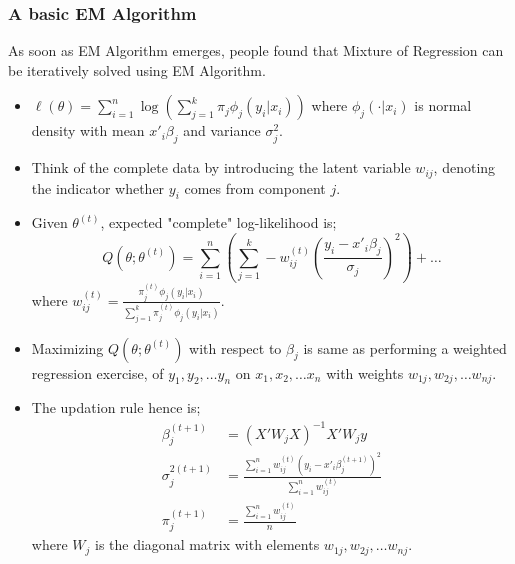 \documentclass{beamer}
\begin{document}
\begin{frame}
	\frametitle{A basic EM Algorithm}
	As soon as EM Algorithm emerges, people found that Mixture of Regression can be iteratively solved using EM Algorithm.
	\begin{itemize}
		\item ${\ell}(\theta) = \sum_{i=1}^{n} \log \left( \sum_{j=1}^{k} \pi_j\phi_j(y_i\vert x_i) \right)$ where $\phi_j(\cdot\vert x_i)$ is normal density with mean $x'_i\beta_j$ and variance $\sigma_j^2$.
		\item Think of the complete data by introducing the latent variable $w_{ij}$, denoting the indicator whether $y_i$ comes from component $j$.
		\item Given $\theta^{(t)}$, expected "complete" log-likelihood is;
		$$Q(\theta; \theta^{(t)}) = \sum_{i=1}^{n} \left( \sum_{j=1}^{k} - w_{ij}^{(t)} \left(\frac{y_i - x'_i\beta_j}{\sigma_j}\right)^2 \right) + \dots $$
		where $w_{ij}^{(t)} = \frac{\pi_j^{(t)}\phi_j(y_i\vert x_i)}{\sum_{j=1}^{k} \pi_j^{(t)}\phi_j(y_i\vert x_i)}$.
	\end{itemize}
\end{frame}

\begin{frame}
	\begin{itemize}
		\item Maximizing $Q(\theta; \theta^{(t)})$ with respect to $\beta_j$ is same as performing a weighted regression exercise, of $y_1, y_2, \dots y_n$ on $x_1, x_2, \dots x_n$ with weights $w_{1j}, w_{2j}, \dots w_{nj}$.
		\item The updation rule hence is;
		\begin{align*}
			\beta_j^{(t+1)} & = \left( X'W_jX \right)^{-1} X'W_jy\\
			\sigma_j^{2(t+1)} & = \frac{\sum_{i=1}^{n} w_{ij}^{(t)} (y_i - x'_i\beta_j^{(t+1)})^2}{\sum_{i=1}^{n} w_{ij}^{(t)}}\\
			\pi_j^{(t+1)} & = \frac{\sum_{i=1}^{n} w_{ij}^{(t)}}{n}
		\end{align*}
		where $W_j$ is the diagonal matrix with elements $w_{1j}, w_{2j}, \dots w_{nj}$.
	\end{itemize}
\end{frame}
\end{document}
